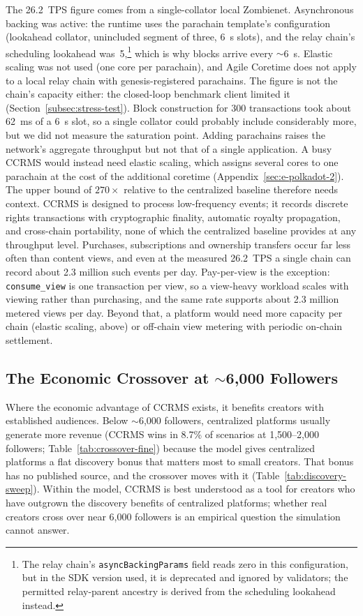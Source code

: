 The 26.2~TPS figure comes from a single-collator local Zombienet. Asynchronous backing was active: the runtime uses the parachain template's configuration (lookahead collator, unincluded segment of three, 6~s slots), and the relay chain's scheduling lookahead was~5,\footnote{The relay chain's \texttt{asyncBackingParams} field reads zero in this configuration, but in the SDK version used, it is deprecated and ignored by validators; the permitted relay-parent ancestry is derived from the scheduling lookahead instead.} which is why blocks arrive every $\sim$6~s. Elastic scaling was not used (one core per parachain), and Agile Coretime does not apply to a local relay chain with genesis-registered parachains. The figure is not the chain's capacity either: the closed-loop benchmark client limited it (Section~\ref{subsec:stress-test}). Block construction for 300 transactions took about 62~ms of a 6~s slot, so a single collator could probably include considerably more, but we did not measure the saturation point. Adding parachains raises the network's aggregate throughput but not that of a single application. A busy CCRMS would instead need elastic scaling, which assigns several cores to one parachain at the cost of the additional coretime (Appendix~\ref{sec:e-polkadot-2}). The upper bound of $270\times$ relative to the centralized baseline therefore needs context. CCRMS is designed to process low-frequency events; it records discrete rights transactions with cryptographic finality, automatic royalty propagation, and cross-chain portability, none of which the centralized baseline provides at any throughput level. Purchases, subscriptions and ownership transfers occur far less often than content views, and even at the measured 26.2~TPS a single chain can record about 2.3 million such events per day. Pay-per-view is the exception: \texttt{consume\_view} is one transaction per view, so a view-heavy workload scales with viewing rather than purchasing, and the same rate supports about 2.3 million metered views per day. Beyond that, a platform would need more capacity per chain (elastic scaling, above) or off-chain view metering with periodic on-chain settlement.

\subsection{The Economic Crossover at \texorpdfstring{$\sim$6,000}{\textasciitilde 6,000} Followers}\label{subsec:economic-crossover}

Where the economic advantage of CCRMS exists, it benefits creators with established audiences. Below $\sim$6,000 followers, centralized platforms usually generate more revenue (CCRMS wins in 8.7\% of scenarios at 1,500--2,000 followers; Table~\ref{tab:crossover-fine}) because the model gives centralized platforms a flat discovery bonus that matters most to small creators. That bonus has no published source, and the crossover moves with it (Table~\ref{tab:discovery-sweep}). Within the model, CCRMS is best understood as a tool for creators who have outgrown the discovery benefits of centralized platforms; whether real creators cross over near 6,000 followers is an empirical question the simulation cannot answer.


